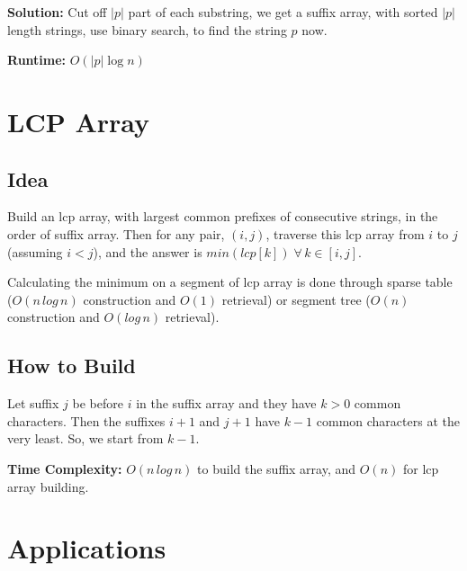 \documentclass{article}
\begin{document}
	\textbf{Solution:} Cut off $|p|$ part of each substring, we get a suffix array, with sorted $|p|$ length strings, use binary search, to find the string $p$ now. \newline
	
	\textbf{Runtime:} $O(|p|\log n)  $
	
	\section{LCP Array}
		\begin{algorithm}[H]
			\SetAlgoLined
			\caption{Problem: Largest Common Prefix Between Two Suffixes}
		\end{algorithm}	
		\vspace{3mm}
		\subsection{Idea} 
			 Build an lcp array, with largest common prefixes of consecutive strings, in the order of suffix array. Then for any pair, $(i,j)$, traverse this lcp array from $i$ to $j$ (assuming $i<j$), and the answer is $min(lcp[k]) \; \forall \, k \in [i,j]$. \newline
			 
			 Calculating the minimum on a segment of lcp array is done through sparse table ($O(n \, log \, n)$ construction and $O(1)$ retrieval) or segment tree ($O(n)$ construction and $O(log \, n)$ retrieval).
		
		\subsection{How to Build}
		Let suffix $j$ be before $i$ in the suffix array and they have $k > 0$ common characters. Then the suffixes $i+1$ and $j+1$ have $k-1$ common characters at the very least. So, we start from $k-1$. \newline
		
		\textbf{Time Complexity:} $O(n \, log \, n)$ to build the suffix array, and $O(n)$ for lcp array building.
		
	\section{Applications}
\end{document}
